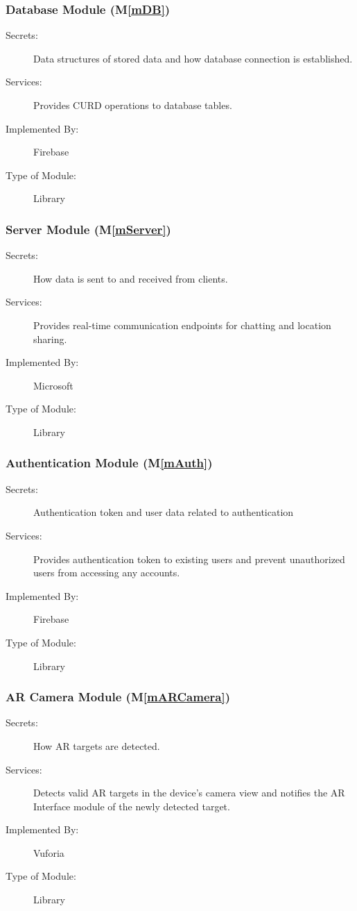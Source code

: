 \documentclass[12pt, titlepage]{article}
\newcommand{\mref}[1]{M\ref{#1}}
\begin{document}
\subsubsection{Database Module (\mref{mDB})}
\begin{description}
\item[Secrets:]Data structures of stored data and how database connection is established.
\item[Services:]Provides CURD operations to database tables.
\item[Implemented By:] Firebase
\item[Type of Module:] Library
\end{description}

\subsubsection{Server Module (\mref{mServer})}
\begin{description}
\item[Secrets:]How data is sent to and received from clients.
\item[Services:]Provides real-time communication endpoints for chatting and location sharing.
\item[Implemented By:] Microsoft
\item[Type of Module:] Library
\end{description}

\subsubsection{Authentication Module (\mref{mAuth})}
\begin{description}
\item[Secrets:]Authentication token and user data related to authentication
\item[Services:]Provides authentication token to existing users and prevent unauthorized users from accessing any accounts.
\item[Implemented By:] Firebase
\item[Type of Module:] Library
\end{description}

\subsubsection{AR Camera Module (\mref{mARCamera})}
\begin{description}
\item[Secrets:]How AR targets are detected.
\item[Services:]Detects valid AR targets in the device's camera view and notifies the AR Interface module of the newly detected target.
\item[Implemented By:] Vuforia
\item[Type of Module:] Library
\end{description}
\end{document}
